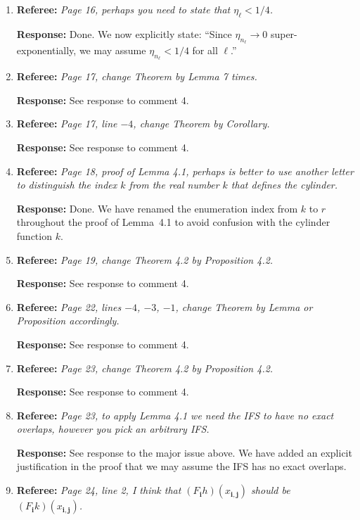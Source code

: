 \documentclass[11pt]{article}
\newcommand{\referee}[1]{\textbf{Referee:} \textit{#1}}
\newcommand{\response}[1]{\textbf{Response:} #1}
\begin{document}
\begin{enumerate}
  \item \referee{Page 16, perhaps you need to state that $\eta_\ell < 1/4$.}

  \response{Done. We now explicitly state: ``Since $\eta_{n_\ell}\to 0$ super-exponentially, we may assume $\eta_{n_\ell} < 1/4$ for all $\ell$.''}

  \item \referee{Page 17, change Theorem by Lemma 7 times.}

  \response{See response to comment 4.}

  \item \referee{Page 17, line $-4$, change Theorem by Corollary.}

  \response{See response to comment 4.}

  \item \referee{Page 18, proof of Lemma 4.1, perhaps is better to use another letter to distinguish the index $k$ from the real number $k$ that defines the cylinder.}

  \response{Done. We have renamed the enumeration index from $k$ to $r$ throughout the proof of Lemma~4.1 to avoid confusion with the cylinder function $k$.}

  \item \referee{Page 19, change Theorem 4.2 by Proposition 4.2.}

  \response{See response to comment 4.}

  \item \referee{Page 22, lines $-4$, $-3$, $-1$, change Theorem by Lemma or Proposition accordingly.}

  \response{See response to comment 4.}

  \item \referee{Page 23, change Theorem 4.2 by Proposition 4.2.}

  \response{See response to comment 4.}

  \item \referee{Page 23, to apply Lemma 4.1 we need the IFS to have no exact overlaps, however you pick an arbitrary IFS.}

  \response{See response to the major issue above. We have added an explicit justification in the proof that we may assume the IFS has no exact overlaps.}

  \item \referee{Page 24, line 2, I think that $(F_{\mathbf{i}}h)(x_{\mathbf{i},\mathbf{j}})$ should be $(F_{\mathbf{i}}k)(x_{\mathbf{i},\mathbf{j}})$.}


\end{enumerate}
\end{document}
